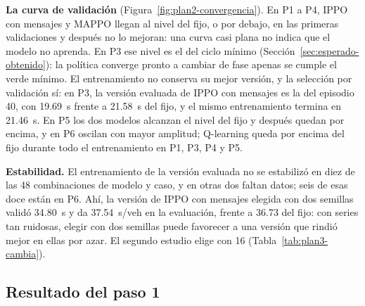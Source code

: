 \noindent\textbf{La curva de validación}
(Figura~\ref{fig:plan2-convergencia}). En P1 a P4, IPPO con mensajes y
MAPPO llegan al nivel del fijo, o por debajo, en las primeras
validaciones y después no lo mejoran: una curva casi plana no indica que
el modelo no aprenda. En P3 ese nivel es el del ciclo mínimo
(Sección~\ref{sec:esperado-obtenido}): la política converge pronto a
cambiar de fase apenas se cumple el verde mínimo. El entrenamiento no
conserva su mejor versión, y la selección por validación sí: en P3, la
versión evaluada de IPPO con mensajes es la del episodio 40, con
19.69~s frente a 21.58~s del fijo, y el mismo entrenamiento termina en
21.46~s. En P5 los dos modelos alcanzan el nivel del fijo y después
quedan por encima, y en P6 oscilan con mayor amplitud; Q-learning queda
por encima del fijo durante todo el entrenamiento en P1, P3, P4 y P5.

\noindent\textbf{Estabilidad.} El entrenamiento de la versión evaluada
no se estabilizó en diez de las 48 combinaciones de modelo y caso, y en
otras dos faltan datos; seis de esas doce están en P6. Ahí, la versión
de IPPO con mensajes elegida con dos semillas validó 34.80~s y da
37.54~s/veh en la evaluación, frente a 36.73 del fijo: con series tan
ruidosas, elegir con dos semillas puede favorecer a una versión que
rindió mejor en ellas por azar. El segundo estudio elige con 16
(Tabla~\ref{tab:plan3-cambia}).


\subsection{Resultado del paso 1}

